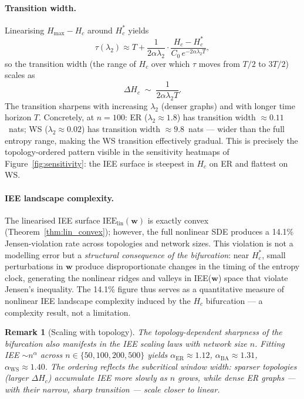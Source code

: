 \documentclass[review,12pt]{elsarticle}
\newcommand{\bfw}{\mathbf{w}}
\newcommand{\IEE}{\mathrm{IEE}}
\newcommand{\Hc}{H_c}
\newcommand{\Hmax}{H_{\max}}
\newcommand{\lambdat}{\lambda_2}
\newtheorem{remark}{Remark}
\begin{document}
\paragraph{Transition width.}
Linearising $\Hmax - \Hc$ around $\Hc^*$ yields
\begin{equation}
  \tau(\lambdat) \approx T + \frac{1}{2\alpha\lambdat}
    \cdot \frac{\Hc - \Hc^*}{C_0\,e^{-2\alpha\lambdat T}},
  \label{eq:tau_transition}
\end{equation}
so the transition width (the range of $\Hc$ over which $\tau$ moves from $T/2$
to $3T/2$) scales as
\[
  \Delta\Hc \;\sim\; \frac{1}{2\alpha\lambdat T}.
\]
The transition sharpens with increasing $\lambdat$ (denser graphs) and
with longer time horizon $T$.  Concretely, at $n = 100$:
ER ($\lambdat \approx 1.8$) has transition width $\approx 0.11$~nats;
WS ($\lambdat \approx 0.02$) has transition width $\approx 9.8$~nats ---
wider than the full entropy range, making the WS transition effectively
gradual.  This is precisely the topology-ordered pattern visible in the
sensitivity heatmaps of Figure~\ref{fig:sensitivity}: the IEE surface
is steepest in $\Hc$ on ER and flattest on WS.

\paragraph{IEE landscape complexity.}
The linearised IEE surface $\IEE_{\mathrm{lin}}(\bfw)$ is exactly convex
(Theorem~\ref{thm:lin_convex}); however, the full nonlinear SDE produces
a 14.1\% Jensen-violation rate across topologies and network sizes.  This
violation is not a modelling error but a \emph{structural consequence of
the bifurcation}: near $\Hc^*$, small perturbations in $\bfw$ produce
disproportionate changes in the timing of the entropy clock, generating
the nonlinear ridges and valleys in IEE($\bfw$) space that violate
Jensen's inequality.  The 14.1\% figure thus serves as a quantitative
measure of nonlinear IEE landscape complexity induced by the $\Hc$
bifurcation --- a complexity result, not a limitation.

\begin{remark}[Scaling with topology]
\label{rem:percolation}
The topology-dependent sharpness of the bifurcation also manifests in the
IEE scaling laws with network size $n$.  Fitting IEE $\sim n^\alpha$ across
$n \in \{50,100,200,500\}$ yields $\alpha_{\mathrm{ER}} \approx 1.12$,
$\alpha_{\mathrm{BA}} \approx 1.31$, $\alpha_{\mathrm{WS}} \approx 1.40$.
The ordering reflects the subcritical window width: sparser topologies
(larger $\Delta\Hc$) accumulate IEE more slowly as $n$ grows, while
dense ER graphs --- with their narrow, sharp transition --- scale closer
to linear.
\end{remark}
\end{document}
